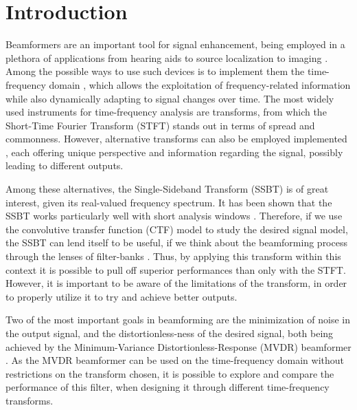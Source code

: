 \section{Introduction}
\label{sec:introduction}

Beamformers are an important tool for signal enhancement, being employed in a plethora of applications from hearing aids \cite{lobato_worst-case-optimization_2020} to source localization \cite{chen_source_2002} to imaging \cite{lu_biomedical_1994,nguyen_minimum_2017}. Among the possible ways to use such devices is to implement them the time-frequency domain \cite{benesty_fundamentals_2017}, which allows the exploitation of frequency-related information while also dynamically adapting to signal changes over time. The most widely used instruments for time-frequency analysis are transforms, from which the Short-Time Fourier Transform (STFT) \cite{kiymik_comparison_2005,pan_microphone_2021} stands out in terms of spread and commonness. However, alternative transforms can also be employed implemented \cite{chen_wavelet-based_2018,yang_general_2014,almeida_fractional_1994}, each offering unique perspective and information regarding the signal, possibly leading to different outputs.

Among these alternatives, the Single-Sideband Transform (SSBT) \cite{crochiere_multirate_1983,oyzerman_speech_2012} is of great interest, given its real-valued frequency spectrum. It has been shown that the SSBT works particularly well with short analysis windows \cite{crochiere_multirate_1983}. Therefore, if we use the convolutive transfer function (CTF) model \cite{talmon_relative_2009} to study the desired signal model, the SSBT can lend itself to be useful, if we think about the beamforming process through the lenses of filter-banks \cite{kumatani_filter_2008,gopinath_tutorial_1993}. Thus, by applying this transform within this context it is possible to pull off superior performances than only with the STFT. However, it is important to be aware of the limitations of the transform, in order to properly utilize it to try and achieve better outputs.

Two of the most important goals in beamforming are the minimization of noise in the output signal, and the distortionless-ness of the desired signal, both being achieved by the Minimum-Variance Distortionless-Response (MVDR) beamformer \cite{capon_high-resolution_1969,erdogan_improved_2016}. As the MVDR beamformer can be used on the time-frequency domain without restrictions on the transform chosen, it is possible to explore and compare the performance of this filter, when designing it through different time-frequency transforms.

